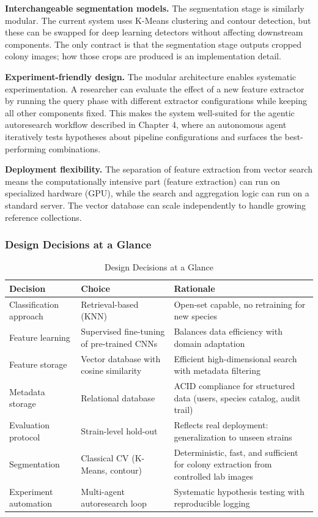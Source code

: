 \textbf{Interchangeable segmentation models.} The segmentation stage is similarly modular. The current system uses K-Means clustering and contour detection, but these can be swapped for deep learning detectors without affecting downstream components. The only contract is that the segmentation stage outputs cropped colony images; how those crops are produced is an implementation detail.

\textbf{Experiment-friendly design.} The modular architecture enables systematic experimentation. A researcher can evaluate the effect of a new feature extractor by running the query phase with different extractor configurations while keeping all other components fixed. This makes the system well-suited for the agentic autoresearch workflow described in Chapter 4, where an autonomous agent iteratively tests hypotheses about pipeline configurations and surfaces the best-performing combinations.

\textbf{Deployment flexibility.} The separation of feature extraction from vector search means the computationally intensive part (feature extraction) can run on specialized hardware (GPU), while the search and aggregation logic can run on a standard server. The vector database can scale independently to handle growing reference collections.

\subsubsection{Design Decisions at a Glance}\label{design-decisions-at-a-glance}

\begin{table}[H]
\centering
\caption{Design Decisions at a Glance}
\label{tab:design-decisions}
\begin{tabular}{@{}p{3.5cm} p{4.5cm} p{6cm}@{}}
\toprule
\textbf{Decision} & \textbf{Choice} & \textbf{Rationale} \\
\midrule
Classification approach & Retrieval-based (KNN) & Open-set capable, no retraining for new species \\
Feature learning & Supervised fine-tuning of pre-trained CNNs & Balances data efficiency with domain adaptation \\
Feature storage & Vector database with cosine similarity & Efficient high-dimensional search with metadata filtering \\
Metadata storage & Relational database & ACID compliance for structured data (users, species catalog, audit trail) \\
Evaluation protocol & Strain-level hold-out & Reflects real deployment: generalization to unseen strains \\
Segmentation & Classical CV (K-Means, contour) & Deterministic, fast, and sufficient for colony extraction from controlled lab images \\
Experiment automation & Multi-agent autoresearch loop & Systematic hypothesis testing with reproducible logging \\
\bottomrule
\end{tabular}
\end{table}
